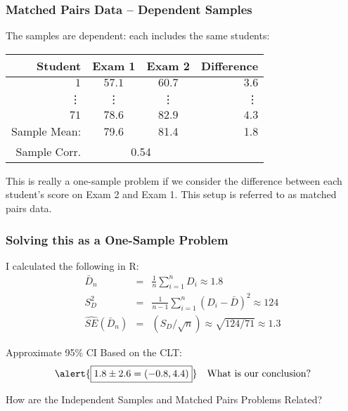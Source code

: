 \begin{frame}
  \frametitle{Matched Pairs Data -- Dependent Samples}
The samples are dependent: each includes \alert{the same students}:
%
\begin{table}[!tbp]
\begin{center}
\begin{tabular}{rccr}
\hline\hline
\multicolumn{1}{r}{Student}&\multicolumn{1}{c}{Exam 1}&\multicolumn{1}{c}{Exam 2}&\multicolumn{1}{r}{Difference}\tabularnewline
\hline
$ 1$&$57.1$&$60.7$&$  3.6$\tabularnewline
\vdots&\vdots&\vdots&\vdots\\
$71$&$78.6$&$82.9$&$  4.3$\tabularnewline
\hline
Sample Mean: & 79.6 & 81.4  &1.8\\
\alert{Sample Corr.} & \multicolumn{2}{c}{\alert{0.54}}&\\
\hline
\end{tabular}
\end{center}
\end{table}

This is really a \alert{one-sample} problem if we consider the \alert{difference} between each student's score on Exam 2 and Exam 1.
This setup is referred to as \alert{matched pairs data}.

\end{frame}
\begin{frame}
\frametitle{Solving this as a One-Sample Problem}
\small
{}

\vspace{2em}
I calculated the following in R:
	\begin{eqnarray*}
	\bar{D}_n &=& \frac{1}{n}\sum_{i=1}^n D_i \approx 1 .8\\
	S^2_D &=& \frac{1}{n-1}\sum_{i=1}^n (D_i - \bar{D})^2 \approx 	124\\ 
	\widehat{SE}(\bar{D}_n) &=&(S_D /\sqrt{n}) \approx \sqrt{124/71} \approx 1.3 
	\end{eqnarray*}
	
\vspace{1em}
\alert{Approximate 95\% CI Based on the CLT:}
$$\alert{\boxed{1.8 \pm 2.6 = (-0.8, 4.4)}} \quad \mbox{What is our conclusion?}$$

\end{frame}
\begin{frame}
	\begin{center}
	\Huge How are the Independent Samples and Matched Pairs Problems Related?
	\end{center}
\end{frame}

